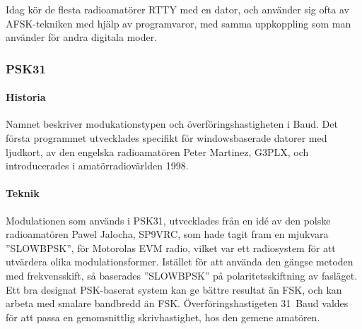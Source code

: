 Idag kör de flesta radioamatörer RTTY med en dator, och använder sig ofta av
AFSK-tekniken med hjälp av programvaror, med samma uppkoppling som man använder
för andra digitala moder.

\subsubsection{PSK31}

\paragraph{Historia}

Namnet beskriver modukationstypen och överföringshastigheten i Baud.
Det första programmet utvecklades specifikt för windowsbaserade datorer med
ljudkort, av den engelska radioamatören Peter Martinez, G3PLX, och
introducerades i amatörradiovärlden 1998.


\paragraph{Teknik}

Modulationen som används i PSK31, utvecklades från en idé av den polske
radioamatören Pawel Jalocha, SP9VRC, som hade tagit fram en mjukvara
”SLOWBPSK”, för Motorolas EVM radio, vilket var ett radiosystem för att
utvärdera olika modulationsformer. 
Istället för att använda den gängse metoden med frekvensskift, så baserades
”SLOWBPSK” på polaritetsskiftning av fasläget. 
Ett bra designat PSK-baserat system kan ge bättre resultat än FSK, och kan
arbeta med smalare bandbredd än FSK.
Överföringshastigeten 31~Baud valdes för att passa en genomsnittlig
skrivhastighet, hos den gemene amatören.
